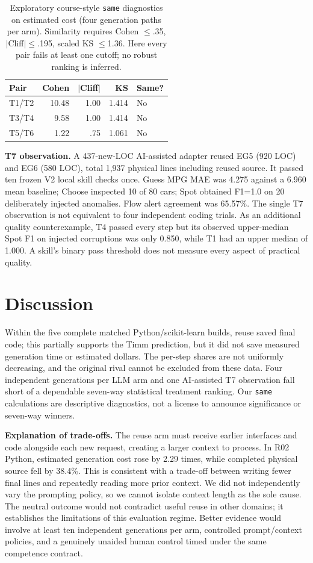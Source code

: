 \documentclass[sigconf,nonacm]{acmart}
\begin{document}
\begin{table}[t]
\caption{Exploratory course-style \texttt{same} diagnostics on estimated cost (four generation paths per arm). Similarity requires Cohen $\leq$.35, $|$Cliff$|\leq$.195, scaled KS $\leq$1.36. Here every pair fails at least one cutoff; no robust ranking is inferred.}
\label{tab:same}\centering\scriptsize
\begin{tabular}{@{}lrrrl@{}}\toprule
Pair & Cohen & $|$Cliff$|$ & KS & Same?\\\midrule
T1/T2 & 10.48 & 1.00 & 1.414 & No\\
T3/T4 & 9.58 & 1.00 & 1.414 & No\\
T5/T6 & 1.22 & .75 & 1.061 & No\\\bottomrule
\end{tabular}
\end{table}

\textbf{T7 observation.} A 437-new-LOC AI-assisted adapter reused EG5 (920 LOC) and EG6 (580 LOC), total 1,937 physical lines including reused source. It passed ten frozen V2 local skill checks once. Guess MPG MAE was 4.275 against a 6.960 mean baseline; Choose inspected 10 of 80 cars; Spot obtained F1=1.0 on 20 deliberately injected anomalies. Flow alert agreement was 65.57\%. The single T7 observation is not equivalent to four independent coding trials. As an additional quality counterexample, T4 passed every step but its observed upper-median Spot F1 on injected corruptions was only 0.850, while T1 had an upper median of 1.000. A skill's binary pass threshold does not measure every aspect of practical quality.

\balance
\section{Discussion}
Within the five complete matched Python/scikit-learn builds, reuse saved final code; this partially supports the Timm prediction, but it did not save measured generation time or estimated dollars. The per-step shares are not uniformly decreasing, and the original rival cannot be excluded from these data. Four independent generations per LLM arm and one AI-assisted T7 observation fall short of a dependable seven-way statistical treatment ranking. Our \texttt{same} calculations are descriptive diagnostics, not a license to announce significance or seven-way winners.

\textbf{Explanation of trade-offs.} The reuse arm must receive earlier interfaces and code alongside each new request, creating a larger context to process. In R02 Python, estimated generation cost rose by 2.29 times, while completed physical source fell by 38.4\%. This is consistent with a trade-off between writing fewer final lines and repeatedly reading more prior context. We did not independently vary the prompting policy, so we cannot isolate context length as the sole cause. The neutral outcome would not contradict useful reuse in other domains; it establishes the limitations of this evaluation regime. Better evidence would involve at least ten independent generations per arm, controlled prompt/context policies, and a genuinely unaided human control timed under the same competence contract.
\end{document}
